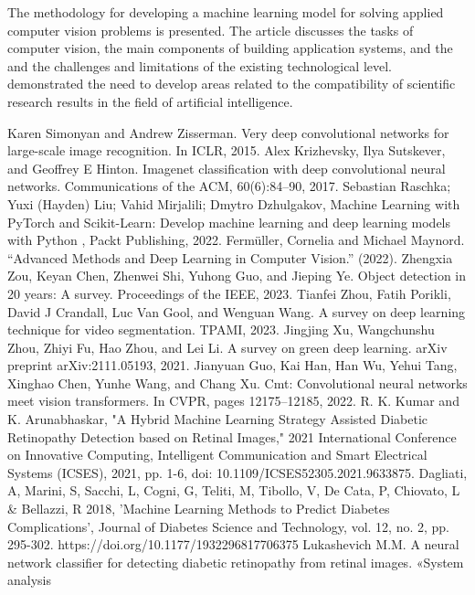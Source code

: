 \documentclass[10pt, a4paper]{article}
\begin{document}
\begin{multicols}{2}
The methodology for developing a machine learning
model for solving applied computer vision problems is
presented. The article discusses the tasks of computer
vision, the main components of building application
systems, and the and the challenges and limitations of
the existing technological level. demonstrated the need
to develop areas related to the compatibility of scientific
research results in the field of artificial intelligence.
\begin{footnotesize}
\begin{thebibliography}{13}
     Karen Simonyan and Andrew Zisserman. Very deep convolutional
networks for large-scale image recognition. In ICLR, 2015.
     Alex Krizhevsky, Ilya Sutskever, and Geoffrey E Hinton. Imagenet
classification with deep convolutional neural networks. Communications of the ACM, 60(6):84–90, 2017.
      Sebastian Raschka; Yuxi (Hayden) Liu; Vahid Mirjalili; Dmytro
Dzhulgakov, Machine Learning with PyTorch and Scikit-Learn:
Develop machine learning and deep learning models with Python
, Packt Publishing, 2022.
     Fermüller, Cornelia and Michael Maynord. “Advanced Methods
and Deep Learning in Computer Vision.” (2022).
     Zhengxia Zou, Keyan Chen, Zhenwei Shi, Yuhong Guo, and
Jieping Ye. Object detection in 20 years: A survey. Proceedings
of the IEEE, 2023.
     Tianfei Zhou, Fatih Porikli, David J Crandall, Luc Van Gool, and
Wenguan Wang. A survey on deep learning technique for video
segmentation. TPAMI, 2023.
      Jingjing Xu, Wangchunshu Zhou, Zhiyi Fu, Hao Zhou, and
Lei Li. A survey on green deep learning. arXiv preprint
arXiv:2111.05193, 2021.
      Jianyuan Guo, Kai Han, Han Wu, Yehui Tang, Xinghao Chen,
Yunhe Wang, and Chang Xu. Cmt: Convolutional neural networks
meet vision transformers. In CVPR, pages 12175–12185, 2022.
      R. K. Kumar and K. Arunabhaskar, "A Hybrid Machine Learning
Strategy Assisted Diabetic Retinopathy Detection based on Retinal Images," 2021 International Conference on Innovative Computing, Intelligent Communication and Smart Electrical Systems
(ICSES), 2021, pp. 1-6, doi: 10.1109/ICSES52305.2021.9633875.
      Dagliati, A, Marini, S, Sacchi, L, Cogni, G, Teliti, M, Tibollo,
V, De Cata, P, Chiovato, L & Bellazzi, R 2018, ’Machine
Learning Methods to Predict Diabetes Complications’, Journal
of Diabetes Science and Technology, vol. 12, no. 2, pp. 295-302.
https://doi.org/10.1177/1932296817706375
      Lukashevich M.M. A neural network classifier for detecting diabetic retinopathy from retinal images. «System analysis

\end{thebibliography}
\end{footnotesize}
\end{multicols}
\end{document}
